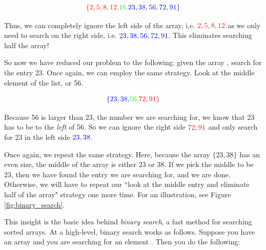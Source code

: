 \begin{equation*}
    \textcolor{red}{\{2, 5, 8, 12,} \textcolor{green}{16,} \textcolor{blue}{23, 38, 56, 72, 91\}}
\end{equation*}

Thus, we can completely ignore the left side of the array, i.e. $\textcolor{red}{2, 5, 8, 12}$ as we only need to search on the right side, i.e. $\textcolor{blue}{23, 38, 56, 72, 91}$. This eliminates searching half the array! 

So now we have reduced our problem to the following: given the array , search for the entry 23.
Once again, we can employ the same strategy. Look at the middle element of the list, or 56.

\begin{equation*}
    \textcolor{blue}{\{23, 38, } \textcolor{green}{56,} \textcolor{red}{72, 91\}}
\end{equation*}

Because 56 is larger than 23, the number we are searching for, we know that 23 has to be to the \emph{left} of 56. So we can ignore the right side $\textcolor{red}{72, 91}$ and only search for 23 in the left side $\textcolor{blue}{23, 38}$.

Once again, we repeat the same strategy. Here, because the array $\{23, 38\}$ has an even size, the middle of the array is either 23 or 38. If we pick the middle to be 23, then we have found the entry we are searching for, and we are done. Otherwise, we will have to repeat our ``look at the middle entry and eliminate half of the array" strategy one more time. For an illustration, see Figure \ref{fig:binary_search}.


This insight is the basic idea behind \emph{binary search}, a fast method for searching sorted arrays. At a high-level, binary search works as follows. Suppose you have an array  and you are searching for an element . Then you do the following:

